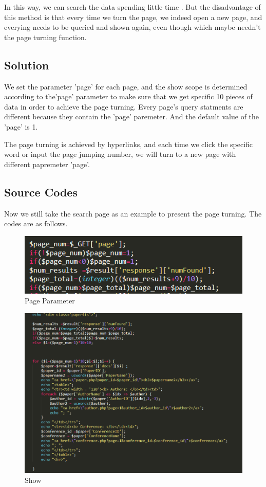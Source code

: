 \documentclass{book}
\begin{document}
In this way, we can search the data spending little time . But the disadvantage of this method is that every time we turn the page, we indeed open a new page, and everying needs to be queried and shown again, even though which maybe needn't the page turning function.

\subsection{Solution}

We set the parameter 'page' for each page, and the show scope is determined according to the'page' parameter to make sure that we get specific 10 pieces of data in order to achieve the page turning. Every page's query statments are different because they contain the 'page' paremeter. And the default value of the 'page' is 1.

The page turning is achieved by hyperlinks, and each time we click the specific word or input the page jumping number, we will turn to a new page with different papremeter 'page'.

\subsection{Source Codes}
Now we still take the search page as an example to present the page turning.  The codes are as follows.

\begin{figure}[ht]
\centering
\includegraphics[scale=0.5]{img/dsw_get.png}
\caption{Page Parameter}
\end{figure}

\begin{figure}[ht]
\centering
\includegraphics[scale=0.35]{img/dsw_show.png}
\caption{Show}
\end{figure}
\end{document}
